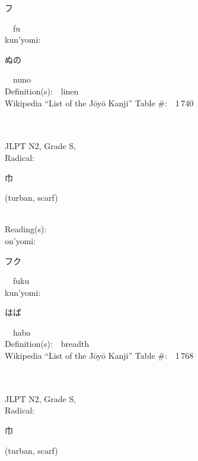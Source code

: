\begin{multicols}{2}
{\hspace*{2em}}{\begin{CJK}{UTF8}{min} フ \end{CJK}}\ \ fu\ \ \\
{\hspace*{1em}}kun'yomi:\ \ \\
{\hspace*{2em}}{\begin{CJK}{UTF8}{min} ぬの \end{CJK}}\ \ nuno\ \ \\
Definition(s):\ \ linen \\
Wikipedia ``List of the J\=oy\=o Kanji'' Table \#:\ \ 1\,740 \\
\ \ \\
{\fontsize{34pt}{40pt}  }\ \ \\  %
{JLPT N2, Grade S, \\Radical:\ \ {\begin{CJK}{UTF8}{min} 巾 \end{CJK}} (turban, scarf) } \\
Reading(s):\ \ \\
{\hspace*{1em}}on'yomi:\ \ \\
{\hspace*{2em}}{\begin{CJK}{UTF8}{min} フク \end{CJK}}\ \ fuku\ \ \\
{\hspace*{1em}}kun'yomi:\ \ \\
{\hspace*{2em}}{\begin{CJK}{UTF8}{min} はば \end{CJK}}\ \ haba\ \ \\
Definition(s):\ \ breadth \\
Wikipedia ``List of the J\=oy\=o Kanji'' Table \#:\ \ 1\,768 \\
\ \ \\
{\fontsize{34pt}{40pt}  }\ \ \\  %
{JLPT N2, Grade S, \\Radical:\ \ {\begin{CJK}{UTF8}{min} 巾 \end{CJK}} (turban, scarf) } \\

\end{multicols}
